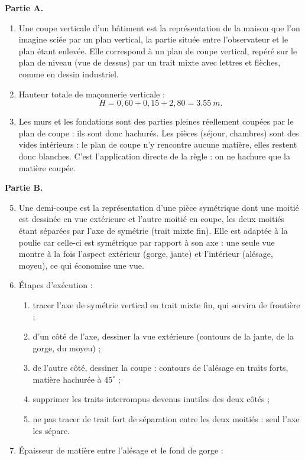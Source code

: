 \documentclass[11pt]{article}
\begin{document}
\begin{corrige}
\textbf{Partie A.}
\begin{enumerate}
\item Une coupe verticale d'un bâtiment est la représentation de la maison que l'on imagine sciée par un plan vertical, la partie située entre l'observateur et le plan étant enlevée. Elle correspond à un plan de coupe vertical, repéré sur le plan de niveau (vue de dessus) par un trait mixte avec lettres et flèches, comme en dessin industriel.
\item Hauteur totale de maçonnerie verticale :
\[ H = 0{,}60 + 0{,}15 + 2{,}80 = \SI{3,55}{m}. \]
\item Les murs et les fondations sont des parties pleines réellement coupées par le plan de coupe : ils sont donc hachurés. Les pièces (séjour, chambres) sont des vides intérieurs : le plan de coupe n'y rencontre aucune matière, elles restent donc blanches. C'est l'application directe de la règle : on ne hachure que la matière coupée.
\end{enumerate}
\textbf{Partie B.}
\begin{enumerate}
\setcounter{enumi}{4}
\item Une demi-coupe est la représentation d'une pièce symétrique dont une moitié est dessinée en vue extérieure et l'autre moitié en coupe, les deux moitiés étant séparées par l'axe de symétrie (trait mixte fin). Elle est adaptée à la poulie car celle-ci est symétrique par rapport à son axe : une seule vue montre à la fois l'aspect extérieur (gorge, jante) et l'intérieur (alésage, moyeu), ce qui économise une vue.
\item Étapes d'exécution :
\begin{enumerate}
\item tracer l'axe de symétrie vertical en trait mixte fin, qui servira de frontière ;
\item d'un côté de l'axe, dessiner la vue extérieure (contours de la jante, de la gorge, du moyeu) ;
\item de l'autre côté, dessiner la coupe : contours de l'alésage en traits forts, matière hachurée à $45^{\circ}$ ;
\item supprimer les traits interrompus devenus inutiles des deux côtés ;
\item ne pas tracer de trait fort de séparation entre les deux moitiés : seul l'axe les sépare.
\end{enumerate}
\item Épaisseur de matière entre l'alésage et le fond de gorge :

\end{enumerate}
\end{corrige}
\end{document}
